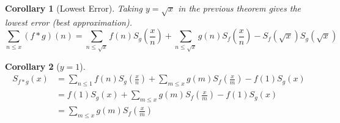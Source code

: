 \documentclass[a4paper, 12pt]{article}
\newtheorem{cor}{Corollary}
\begin{document}
\begin{cor}[Lowest Error] Taking $y = \sqrt{x}$ in the previous theorem gives the lowest error (best approximation).
\begin{equation*}
    \sum_{n\le x}(f*g)(n) = \sum_{n\le\sqrt{x}}f(n)S_{g}\left(\frac{x}{n}\right) + \sum_{n\le\sqrt{x}}g(n)S_{f}\left(\frac{x}{n}\right) - S_{f}(\sqrt{x})S_{g}(\sqrt{x})
\end{equation*}
\end{cor}


\begin{cor}[$y=1$]
\begin{align*}
    S_{f*g}(x) &= \sum_{n\le 1}f(n)S_{g}\left(\frac{x}{n}\right) + \sum_{m\le x}g(m)S_{f}\left(\frac{x}{m}\right) - f(1)S_{g}(x) \\
    &= f(1)S_{g}(x) + \sum_{m\le x}g(m)S_{f}\left(\frac{x}{m}\right) - f(1)S_{g}(x) \\
    &= \sum_{m\le x}g(m)S_{f}\left(\frac{x}{m}\right)
\end{align*}
\end{cor}
\end{document}
